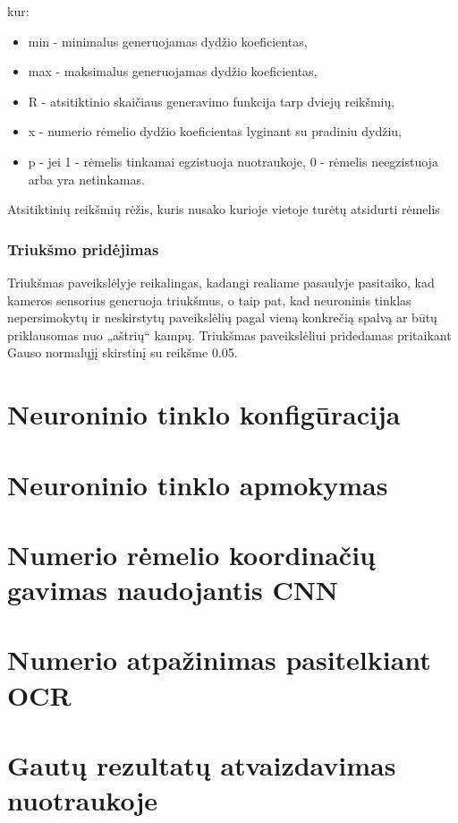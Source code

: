 \documentclass{VUMIFPSkursinis}
\begin{document}
kur:
\begin{itemize}
  \item min - minimalus generuojamas dydžio koeficientas,
  \item max - maksimalus generuojamas dydžio koeficientas,
  \item R - atsitiktinio skaičiaus generavimo funkcija tarp dviejų reikšmių,
  \item x - numerio rėmelio dydžio koeficientas lyginant su pradiniu dydžiu,
  \item p - jei 1 - rėmelis tinkamai egzistuoja nuotraukoje, 0 - rėmelis neegzistuoja arba yra netinkamas.
\end{itemize}



Atsitiktinių reikšmių rėžis, kuris nusako kurioje vietoje turėtų atsidurti rėmelis
\subsubsection{Triukšmo pridėjimas}
Triukšmas paveikslėlyje reikalingas, kadangi realiame pasaulyje pasitaiko, kad kameros sensorius generuoja triukšmus, o taip pat,
kad neuroninis tinklas nepersimokytų ir neskirstytų paveikslėlių pagal vieną konkrečią spalvą ar būtų priklausomas nuo „aštrių“ kampų.
Triukšmas paveikslėliui pridedamas pritaikant Gauso normalųjį skirstinį su reikšme 0.05.



\section{Neuroninio tinklo konfigūracija}

\section{Neuroninio tinklo apmokymas}

\section{Numerio rėmelio koordinačių gavimas naudojantis CNN}

\section{Numerio atpažinimas pasitelkiant OCR}

\section{Gautų rezultatų atvaizdavimas nuotraukoje}
\end{document}

